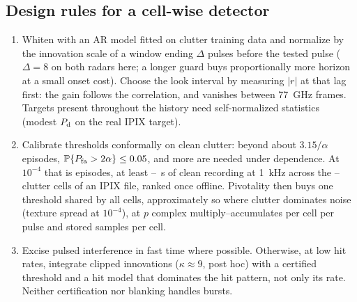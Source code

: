 \documentclass[journal]{IEEEtran}
\newcommand{\PP}{\mathbb{P}}
\begin{document}
\subsection{Design rules for a cell-wise detector}
\begin{enumerate}[leftmargin=*,itemsep=0pt]
\item Whiten with an AR model fitted on clutter training data and normalize by the innovation scale of a window ending $\Delta$ pulses before the tested pulse ($\Delta=8$ on both radars here; a longer guard buys proportionally more horizon at a small onset cost). Choose the look interval by measuring $|r|$ at that lag first: the gain follows the correlation, and vanishes between 77~GHz frames. Targets present throughout the history need self-normalized statistics (modest $P_{\rm d}$ on the real IPIX target).
\item Calibrate thresholds conformally on clean clutter: beyond about $3.15/\alpha$ episodes, $\PP\{P_{\rm fa}>2\alpha\}\le0.05$, and more are needed under dependence. At $10^{-4}$ that is \CalEpisodesFour{} episodes, at least \CalSecondsMin--\CalSecondsMax~s of clean recording at 1~kHz across the \CalCellsMin--\CalCellsMax{} clutter cells of an IPIX file, ranked once offline. Pivotality then buys one threshold shared by all cells, approximately so where clutter dominates noise (texture spread \LInConfSpreadFour{} at $10^{-4}$), at $p$ complex multiply--accumulates per cell per pulse and \StatePerCell{} stored samples per cell.
\item Excise pulsed interference in fast time where possible. Otherwise, at low hit rates, integrate clipped innovations ($\kappa\approx9$, post hoc) with a certified threshold and a hit model that dominates the hit pattern, not only its rate. Neither certification nor blanking handles bursts.
\end{enumerate}
\end{document}
